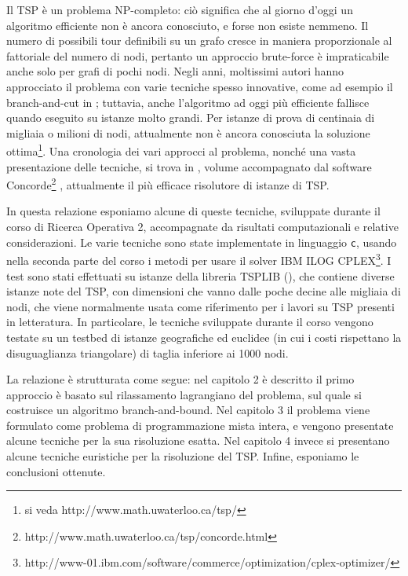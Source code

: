 Il TSP è un problema NP-completo: ciò significa che al giorno d'oggi un algoritmo efficiente non è ancora conosciuto, e forse non esiste nemmeno. Il numero di possibili tour definibili su un grafo cresce in maniera proporzionale al fattoriale del numero di nodi, pertanto un approccio brute-force è impraticabile anche solo per grafi di pochi nodi. Negli anni, moltissimi autori hanno approcciato il problema con varie tecniche spesso innovative, come ad esempio il branch-and-cut in \citet*{padberg1991branch}; tuttavia, anche l'algoritmo ad oggi più efficiente fallisce quando eseguito su istanze molto grandi. Per istanze di prova di centinaia di migliaia o milioni di nodi, attualmente non è ancora conosciuta la soluzione ottima\footnote{si veda http://www.math.uwaterloo.ca/tsp/}. Una cronologia dei vari approcci al problema, nonché una vasta presentazione delle tecniche, si trova in \citet*{applegate2011traveling}, volume accompagnato dal software Concorde\footnote{http://www.math.uwaterloo.ca/tsp/concorde.html} \citep{applegate2006concorde}, attualmente il più efficace risolutore di istanze di TSP.

In questa relazione esponiamo alcune di queste tecniche, sviluppate durante il corso di Ricerca Operativa 2, accompagnate da risultati computazionali e relative considerazioni. Le varie tecniche sono state implementate in linguaggio \texttt{c}, usando nella seconda parte del corso i metodi per usare il solver IBM ILOG CPLEX\footnote{http://www-01.ibm.com/software/commerce/optimization/cplex-optimizer/}. I test sono stati effettuati su istanze della libreria TSPLIB (\citet*{reinelt1991tsplib}), che contiene diverse istanze note del TSP, con dimensioni che vanno dalle poche decine alle migliaia di nodi, che viene normalmente usata come riferimento per i lavori su TSP presenti in letteratura. In particolare, le tecniche sviluppate durante il corso vengono testate su un testbed di istanze geografiche ed euclidee (in cui i costi rispettano la disuguaglianza triangolare) di taglia inferiore ai 1000 nodi.

La relazione è strutturata come segue: nel capitolo 2 è descritto il primo approccio è basato sul rilassamento lagrangiano del problema, sul quale si costruisce un algoritmo branch-and-bound.  Nel capitolo 3 il problema viene formulato come problema di programmazione mista intera, e vengono presentate alcune tecniche per la sua risoluzione esatta. Nel capitolo 4 invece si presentano alcune tecniche euristiche per la risoluzione del TSP. Infine, esponiamo le conclusioni ottenute.
